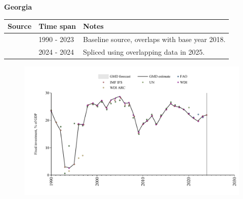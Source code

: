 \documentclass[12pt,a4paper,landscape]{article}
\begin{document}
\begin{adjustbox}{max totalsize={\paperwidth}{\paperheight},center}
\begin{minipage}[t][\textheight][t]{\textwidth}
\vspace*{0.5cm}
{}
\begin{center}
{\Large\bfseries Georgia}
\end{center}
\vspace{0.5cm}
\begin{table}[H]
\centering
\small
\begin{tabular}{|l|l|l|}
\hline
\textbf{Source} & \textbf{Time span} & \textbf{Notes} \\
\hline
\rowcolor{white}\cite{WDI}& 1990 - 2023 &Baseline source, overlaps with base year 2018.\\
\rowcolor{lightgray}\cite{IMF_IFS}& 2024 - 2024 &Spliced using overlapping data in 2025.\\
\hline
\end{tabular}
\end{table}
\begin{figure}[H]
\centering
\includegraphics[width=\textwidth,height=0.6\textheight,keepaspectratio]{graphs/GEO_finv_GDP.pdf}
\end{figure}
\end{minipage}
\end{adjustbox}
\end{document}
